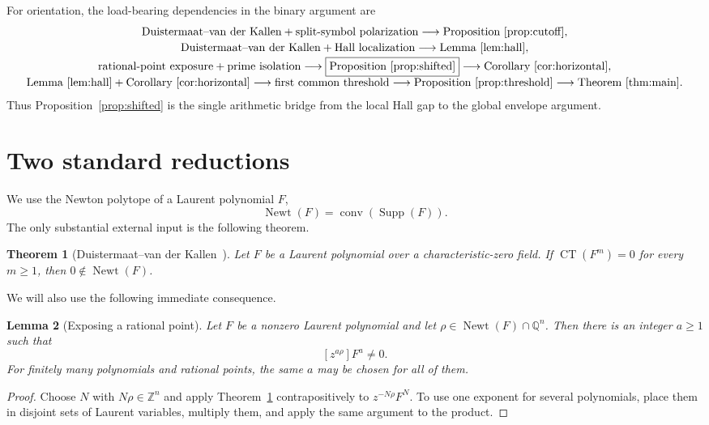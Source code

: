 \documentclass[11pt]{article}
\newtheorem{theorem}{Theorem}[section]
\newtheorem{lemma}[theorem]{Lemma}
\newcommand{\Q}{\mathbb Q}
\newcommand{\Z}{\mathbb Z}
\newcommand{\Newt}{\operatorname{Newt}}
\newcommand{\Supp}{\operatorname{Supp}}
\newcommand{\CT}{\operatorname{CT}}
\begin{document}
For orientation, the load-bearing dependencies in the binary argument are
\[
\begin{array}{c}
 \text{Duistermaat--van der Kallen}+\text{split-symbol polarization}
   \longrightarrow \text{Proposition~\ref{prop:cutoff}},\\[2pt]
 \text{Duistermaat--van der Kallen}+\text{Hall localization}
   \longrightarrow \text{Lemma~\ref{lem:hall}},\\[2pt]
 \text{rational-point exposure}+\text{prime isolation}
   \longrightarrow \boxed{\text{Proposition~\ref{prop:shifted}}}
   \longrightarrow \text{Corollary~\ref{cor:horizontal}},\\[2pt]
 \text{Lemma~\ref{lem:hall}}+\text{Corollary~\ref{cor:horizontal}}
   \longrightarrow \text{first common threshold}
   \longrightarrow \text{Proposition~\ref{prop:threshold}}
   \longrightarrow \text{Theorem~\ref{thm:main}}.
\end{array}
\]
Thus Proposition~\ref{prop:shifted} is the single arithmetic bridge from
the local Hall gap to the global envelope argument.

\section{Two standard reductions}

We use the Newton polytope of a Laurent polynomial $F$,
\[
 \Newt(F)=\operatorname{conv}(\Supp(F)).
\]
The only substantial external input is the following theorem.

\begin{theorem}[Duistermaat--van der Kallen~\cite{DK}]\label{thm:dk}
Let $F$ be a Laurent polynomial over a characteristic-zero field.  If
$\CT(F^m)=0$ for every $m\geq1$, then
$0\notin\Newt(F)$.
\end{theorem}

We will also use the following immediate consequence.

\begin{lemma}[Exposing a rational point]\label{lem:expose}
Let $F$ be a nonzero Laurent polynomial and let
$\rho\in\Newt(F)\cap\Q^n$.  Then there is an integer $a\geq1$ such that
\[
 [z^{a\rho}]F^a\ne0.
\]
For finitely many polynomials and rational points, the same $a$ may be
chosen for all of them.
\end{lemma}

\begin{proof}
Choose $N$ with $N\rho\in\Z^n$ and apply
Theorem~\ref{thm:dk} contrapositively to
$z^{-N\rho}F^N$.  To use one exponent for several polynomials, place them
in disjoint sets of Laurent variables, multiply them, and apply the same
argument to the product.
\end{proof}
\end{document}
